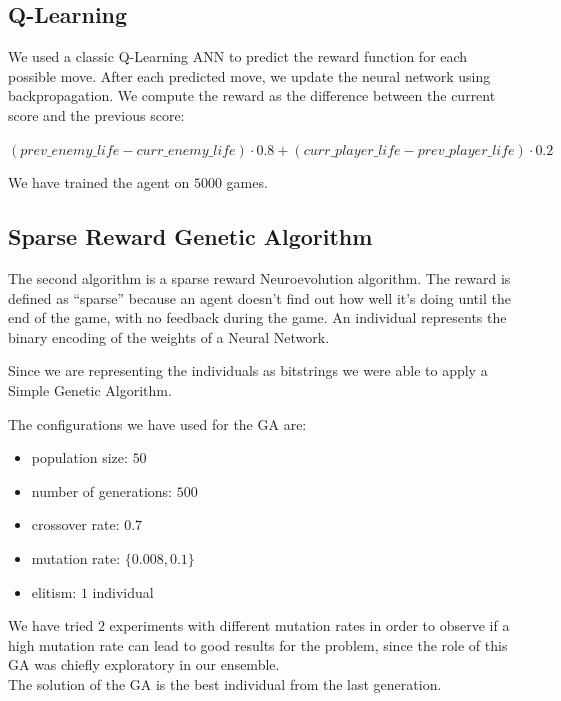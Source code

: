 \documentclass[conference]{IEEEtran}
\begin{document}
    
    \subsection{Q-Learning}\label{subsec:q-learning}
    We used a classic Q-Learning ANN to predict the reward function for each possible move.
    After each predicted move, we update the neural network using backpropagation. We compute the reward as the difference between the current score and the previous score:
    
    $ (prev\_enemy\_life - curr\_enemy\_life) \cdot 0.8 + (curr\_player\_life - prev\_player\_life) \cdot 0.2 $
    
    We have trained the agent on $5000$ games.

    \subsection{Sparse Reward Genetic Algorithm}
    The second algorithm is a sparse reward Neuroevolution\cite{neuro} algorithm.
    The reward is defined as ``sparse'' because an agent doesn't find out how well it's doing until
    the end of the game, with no feedback during the game.
    An individual represents the binary encoding of the weights of a Neural Network.

    Since we are representing the individuals as bitstrings we were able to apply
    a Simple Genetic Algorithm\cite{genetic_algorithm}.

    \pagebreak
    
    The configurations we have used for the GA are:
    \begin{itemize}
        \item population size: $50$
        \item number of generations: $500$
        \item crossover rate: $0.7$
        \item mutation rate: $\{0.008, 0.1\}$
        \item elitism: $1$ individual
    \end{itemize}
    We have tried $2$ experiments with different mutation rates in order to observe if a high
    mutation rate can lead to good results for the problem, since the role of this GA was
    chiefly exploratory in our ensemble. \\

    The solution of the GA is the best individual from the last generation.
\end{document}
